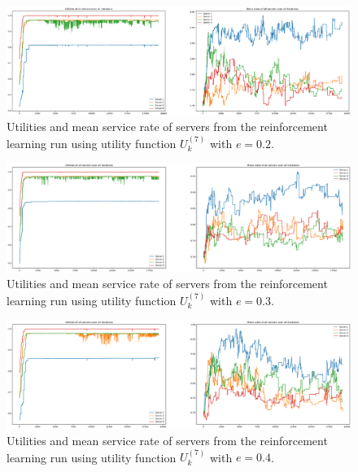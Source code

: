 \begin{figure}[H]
    \includegraphics[width=\textwidth]{chapters/00_appendix/03_more_rl_results/Bin/utility_7_eps/u7_1_e02.eps}
    \caption{Utilities and mean service rate of servers from the reinforcement
    learning run using utility function \(U_k^{(7)}\) with \(e = 0.2\).}
    \label{fig:RL_utility7_1_e02}
\end{figure}


\begin{figure}[H]
    \includegraphics[width=\textwidth]{chapters/00_appendix/03_more_rl_results/Bin/utility_7_eps/u7_1_e03.eps}
    \caption{Utilities and mean service rate of servers from the reinforcement
    learning run using utility function \(U_k^{(7)}\) with \(e = 0.3\).}
    \label{fig:RL_utility7_1_e03}
\end{figure}


\begin{figure}[H]
    \includegraphics[width=\textwidth]{chapters/00_appendix/03_more_rl_results/Bin/utility_7_eps/u7_1_e04.eps}
    \caption{Utilities and mean service rate of servers from the reinforcement
    learning run using utility function \(U_k^{(7)}\) with \(e = 0.4\).}
    \label{fig:RL_utility7_1_e04}
\end{figure}


